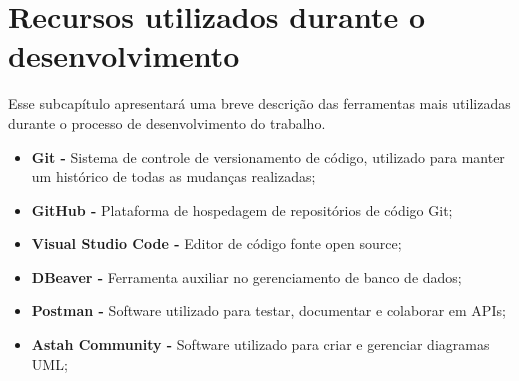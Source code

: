 \section{Recursos utilizados durante o desenvolvimento}
\label{sec:recursos}

Esse subcapítulo apresentará uma breve descrição das ferramentas mais utilizadas durante o processo de desenvolvimento do trabalho.
\begin{itemize}
    \item \textbf{Git -} Sistema de controle de versionamento de código, utilizado para manter um histórico de todas as mudanças realizadas;
    \item \textbf{GitHub -} Plataforma de hospedagem de repositórios de código Git;
    \item \textbf{Visual Studio Code -} Editor de código fonte open source;
    \item \textbf{DBeaver -} Ferramenta auxiliar no gerenciamento de banco de dados;
    \item \textbf{Postman -} Software utilizado para testar, documentar e colaborar em APIs;
    \item \textbf{Astah Community -} Software utilizado para criar e gerenciar diagramas UML;
\end{itemize}